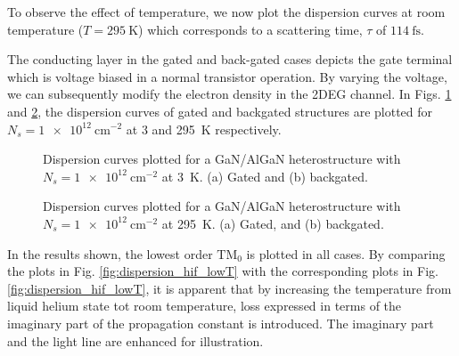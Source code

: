 %
To observe the effect of temperature, we now plot the dispersion curves at room temperature ($T = \SI{295}{\kelvin}$) which corresponds to a scattering time, $\tau$ of $\SI{114}{\fs}$.
\begin{sidewaysfigure}
  \centering
  \caption{Dispersion curves plotted for a GaN/AlGaN heterostructure with $N_s = \SI{5e13}{\cm^{-2}}$ at \SI{295}{\kelvin}. (a) Gated, (b) backgated, and (c) ungated.}
  \label{fig:dispersion_hif_hiT}
\end{sidewaysfigure}
%
The conducting layer in the gated and back-gated cases depicts the gate terminal which is voltage biased in a normal transistor operation. By varying the voltage, we can subsequently modify the electron density in the 2DEG channel. In Figs. \ref{fig:dispersion_lof_lowT} and \ref{fig:dispersion_lof_hiT}, the dispersion curves of gated and backgated structures are plotted for $N_s = \SI{1e12}{\cm^{-2}}$ at \SI{3}{} and \SI{295}{\kelvin} respectively.
\begin{figure}[!htbp]
  \begin{center}
  \caption{Dispersion curves plotted for a GaN/AlGaN heterostructure with $N_s = \SI{1e12}{\cm^{-2}}$ at \SI{3}{\kelvin}. (a) Gated and (b) backgated.}
  \label{fig:dispersion_lof_lowT}
  \end{center}
\end{figure}
%
\begin{figure}[!htbp]
  \begin{center}
  \caption{Dispersion curves plotted for a GaN/AlGaN heterostructure with $N_s = \SI{1e12}{\cm^{-2}}$ at \SI{295}{\kelvin}. (a) Gated, and (b) backgated.}
  \label{fig:dispersion_lof_hiT}
  \end{center}
\end{figure}
%
In the results shown, the lowest order $\text{TM}_0$ is plotted in all cases. By comparing the plots in Fig. \ref{fig:dispersion_hif_lowT} with the corresponding plots in Fig. \ref{fig:dispersion_hif_lowT}, it is apparent that by increasing the temperature from liquid helium state tot room temperature, loss expressed in terms of the imaginary part of the propagation constant is introduced. The imaginary part and the light line are enhanced for illustration.

